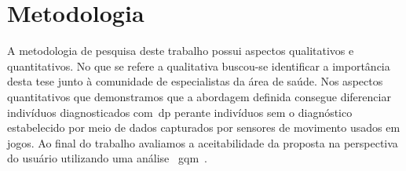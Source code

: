 \section{Metodologia}
A metodologia de pesquisa deste trabalho possui aspectos qualitativos e quantitativos. No que se refere a qualitativa buscou-se identificar a importância desta tese junto à comunidade de especialistas da área de saúde. Nos aspectos quantitativos que demonstramos que a abordagem definida consegue diferenciar indivíduos diagnosticados com~\ac{dp} perante indivíduos sem o diagnóstico estabelecido por meio de dados capturados por sensores de movimento usados em jogos. Ao final do trabalho avaliamos a aceitabilidade da proposta na perspectiva do usuário utilizando uma análise ~\ac{gqm}~\cite{van1999goal}. %

